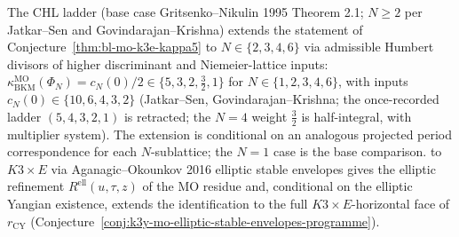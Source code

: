 \begin{remark}[Extension to $N \in \{2, 3, 4, 6\}$]
\label{rem:bl-mo-CHL-ladder}
The CHL ladder (base case Gritsenko--Nikulin 1995 Theorem 2.1;
$N \geq 2$ per Jatkar--Sen and Govindarajan--Krishna) extends the
statement of Conjecture~\ref{thm:bl-mo-k3e-kappa5} to $N \in \{2, 3, 4, 6\}$
via admissible Humbert divisors of higher discriminant and
Niemeier-lattice inputs:
$\kappa_{\mathrm{BKM}}^{\mathrm{MO}}(\Phi_{N}) = c_{N}(0)/2 \in
\bigl\{5, 3, 2, \tfrac32, 1\bigr\}$ for $N \in \{1, 2, 3, 4, 6\}$, with inputs
$c_{N}(0) \in \{10, 6, 4, 3, 2\}$ (Jatkar--Sen, Govindarajan--Krishna;
the once-recorded ladder $(5, 4, 3, 2, 1)$ is retracted; the $N = 4$
weight $\tfrac32$ is half-integral, with multiplier system). The extension is conditional on
an analogous projected period correspondence for each \(N\)-sublattice; the
\(N=1\) case is the base comparison.
to $K3 \times E$ via Aganagic--Okounkov 2016 elliptic stable envelopes
gives the elliptic refinement
$R^{\mathrm{ell}}(u, \tau, z)$ of the MO residue and, conditional
on the elliptic Yangian existence, extends the identification to the
full $K3 \times E$-horizontal face of $r_{\mathrm{CY}}$
(Conjecture~\ref{conj:k3y-mo-elliptic-stable-envelopes-programme}).
\end{remark}
